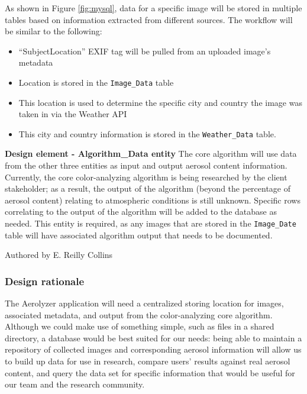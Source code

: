 \documentclass[onecolumn, draftclsnofoot,10pt, compsoc]{IEEEtran}
\begin{document}
\begin{flushleft}
\medskip

As shown in Figure \ref{fig:mysql}, data for a specific image will be stored in multiple tables based on information extracted from different sources. The workflow will be similar to the following:
\begin{itemize}
\item  “SubjectLocation” EXIF tag will be pulled from an uploaded image’s metadata 
\item  Location is stored in the \texttt{Image\_Data} table
\item This location is used to determine the specific city and country the image was taken in via the Weather API
\item This city and country information is stored in the \texttt{Weather\_Data} table.
\end{itemize}

\medskip 

\textbf{Design element - Algorithm\_Data entity}
The core algorithm will use data from the other three entities as input and output aerosol content information. Currently, the core color-analyzing algorithm is being researched by the client stakeholder; as a result, the output of the algorithm (beyond the percentage of aerosol content) relating to atmospheric conditions is still unknown. Specific rows correlating to the output of the algorithm will be added to the database as needed. This entity is required, as any images that are stored in the \texttt{Image\_Date} table will have associated algorithm output that needs to be documented.

\smallskip

\footnotesize Authored by E. Reilly Collins

\normalsize

\bigskip


\subsubsection{Design rationale}
The Aerolyzer application will need a centralized storing location for images, associated metadata, and output from the color-analyzing core algorithm. Although we could make use of something simple, such as files in a shared directory, a database would be best suited for our needs: being able to maintain a repository of collected images and corresponding aerosol information will allow us to build up data for use in research, compare users’ results against real aerosol content, and query the data set for specific information that would be useful for our team and the research community. 


\end{flushleft}
\end{document}
